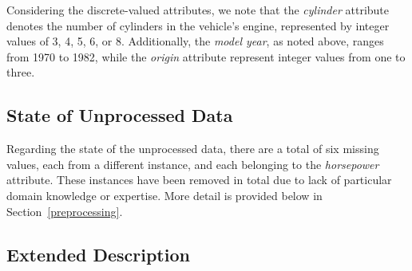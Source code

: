 \documentclass[10pt, conference, compsocconf]{IEEEtran}
\begin{document}
Considering the discrete-valued attributes, we note that the \textit{cylinder} attribute denotes the number of cylinders in the vehicle's engine, represented by integer values of 3, 4, 5, 6, or 8. Additionally, the \textit{model year}, as noted above, ranges from 1970 to 1982, while the \textit{origin} attribute represent integer values from one to three. 

\subsection{State of Unprocessed Data}

Regarding the state of the unprocessed data, there are a total of six missing values, each from a different instance, and each belonging to the \textit{horsepower} attribute. These instances have been removed in total due to lack of particular domain knowledge or expertise. More detail is provided below in Section~\ref{preprocessing}.

\subsection{Extended Description}
\end{document}
